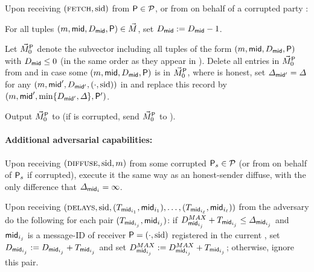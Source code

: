 \begin{cccFunctionality}
\begin{cccItemize}[nosep]
            \item Upon receiving $(\textsc{fetch}, \mathrm{sid})$ from $\mathsf{P} \in \mathcal{P}$, or from \adv on behalf of a corrupted party \party:
            \begin{cccEnum}[nosep]
                  \item For all tuples $(m, \mathsf{mid}, D_\mathsf{mid}, \mathsf{P}) \in \vec{M}$, set $D_\mathsf{mid} := D_\mathsf{mid} - 1$.
                  \item Let $\vec{M}^\mathsf{P}_0$ denote the subvector \vecM including all tuples of the form $(m, \mathsf{mid}, D_\mathsf{mid}, \mathsf{P})$ with $D_\mathsf{mid} \le 0$ (in the same order as they appear in \vecM).
                  Delete all entries in $\vec{M}^\mathsf{P}_0$ from \vecM and in case some $(m, \mathsf{mid}, D_\mathsf{mid}, \mathsf{P})$ is in
                  $\vec{M}^\mathsf{P}_0$, where \party is honest, set $\varDelta_{\mathsf{mid}'} = \varDelta$ for any $(m, \mathsf{mid}', D_{\mathsf{mid}'}, (\cdot, \mathrm{sid}))$ in \vecM and replace this record by $(m, \mathsf{mid}', \min \{ D_{\mathsf{mid}'}, \varDelta \}, \mathsf{P}')$.
                  \item Output $\vec{M}^\mathsf{P}_0$ to \party (if \party is corrupted, send $\vec{M}^\mathsf{P}_0$ to \adv).
            \end{cccEnum}
      \end{cccItemize}

      \paragraph{Additional adversarial capabilities:}
      \begin{cccItemize}[nosep]
            \item Upon receiving $(\textsc{diffuse}, \mathrm{sid}, m)$ from some corrupted $\mathsf{P}_s \in \mathcal{P}$ (or from \adv on behalf of $\mathsf{P}_s$ if corrupted),
            execute it the same way as an honest-sender diffuse, with the only difference that $\varDelta_{\mathsf{mid}_i} = \infty$.

            \item Upon receiving $(\textsc{delays}, \mathrm{sid}, (T_{\mathsf{mid}_{i_1}}, \mathsf{mid}_{i_1}), \ldots, (T_{\mathsf{mid}_{i_\ell}}, \mathsf{mid}_{i_\ell}))$ from the adversary do the following for each pair $(T_{\mathsf{mid}_{i_j}}, \mathsf{mid}_{i_j})$:
            if $D^{MAX}_{\mathsf{mid}_{i_j}} + T_{\mathsf{mid}_{i_j}} \le \varDelta_{\mathsf{mid}_{i_j}}$ and $\mathsf{mid}_{i_j}$ is a message-ID of receiver $\mathsf{P} = (\cdot, \mathrm{sid})$ registered in the current \vecM, set $D_{\mathsf{mid}_{i_j}} := D_{\mathsf{mid}_{i_j}} + T_{\mathsf{mid}_{i_j}}$ and set $D^{MAX}_{\mathsf{mid}_{i_j}} := D^{MAX}_{\mathsf{mid}_{i_j}} + T_{\mathsf{mid}_{i_j}}$; otherwise, ignore this pair.


\end{cccItemize}
\end{cccFunctionality}
